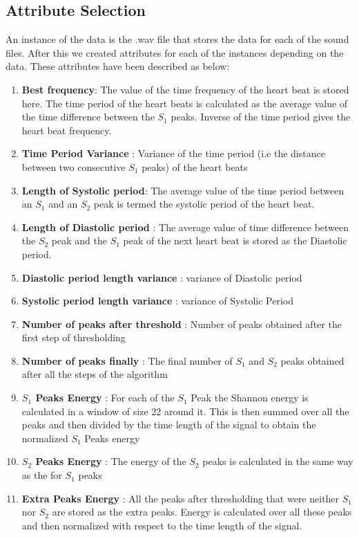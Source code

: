 \documentclass{article}
\begin{document}
\subsection{Attribute Selection}
An instance of the data is the .wav file that stores the data for each of the sound files. After this we created attributes for each of the instances depending on the data. These attributes have been described as below:
\begin{enumerate}
\item \textbf{Best frequency}: The value of the time frequency of the heart beat is stored here. The time period of the heart beats is calculated as the average value of the time difference between the $S_1$ peaks. Inverse of the time period gives the heart beat frequency.
\item \textbf{Time Period Variance} : Variance of the time period (i.e the distance between two consecutive $S_1$ peaks) of the heart beats 
\item \textbf{Length of Systolic period}: The average value of the time period between an $S_1$ and an $S_2$ peak is termed the systolic period of the heart beat. 
\item \textbf{Length of Diastolic period} : The average value of time difference between the $S_2$ peak and the $S_1$ peak of the next heart beat is stored as the Diastolic period.
\item \textbf{Diastolic period length variance} : variance of Diastolic period
\item \textbf{Systolic period length variance} : variance of Systolic Period
\item \textbf{Number of peaks after threshold} : Number of peaks obtained after the first step of thresholding
\item \textbf{Number of peaks finally} : The final number of $S_1$ and $S_2$ peaks obtained after all the steps of the algorithm
\item \textbf{$S_1$ Peaks Energy} : For each of the $S_1$ Peak the Shannon energy is calculated in a window of size 22 around it. This is then summed over all the peaks and then divided by the time length of the signal to obtain the normalized $S_1$ Peaks energy
\item \textbf{$S_2$ Peaks Energy} : The energy of the $S_2$ peaks is calculated in the same way as the for $S_1$ peaks
\item \textbf{Extra Peaks Energy} : All the peaks after thresholding that were neither $S_1$ nor $S_2$ are stored as the extra peaks. Energy is calculated over all these peaks and then normalized with respect to the time length of the signal.

\end{enumerate}
\end{document}
